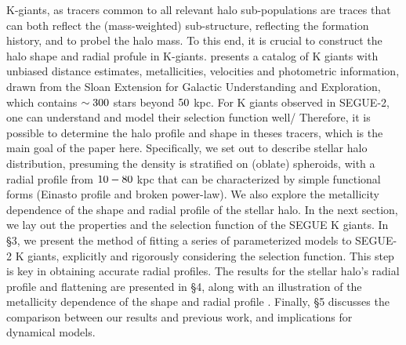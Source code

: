 \documentclass[12pt,preprint]{aastex}
\begin{document}
K-giants, as tracers common to all relevant halo sub-populations are traces that can both reflect the (mass-weighted) sub-structure, reflecting the formation history, and to probel the halo mass. To this end, it is crucial to construct the halo shape and radial profule in K-giants. \citet{Xue2014} presents a catalog of K giants with unbiased distance estimates, metallicities, velocities and photometric information, drawn from the Sloan Extension for Galactic Understanding and Exploration\citep[][SEGUE]{Yanny2009b}, which contains $\rm \sim 300$ stars beyond $\rm 50~$kpc.
For K giants observed in SEGUE-2, one can understand and model their selection function well/ Therefore, it is possible to determine the halo profile and shape in theses tracers, which is the main goal of the paper here.
Specifically, we set out to describe stellar halo distribution, presuming the density is stratified on (oblate) spheroids, with a radial profile from $\rm 10-80~$kpc that can be characterized by simple  functional forms (Einasto profile and broken power-law). We also explore the metallicity dependence of the shape and radial profile of the stellar halo.
In the next section, we lay out the properties and the selection function of the SEGUE K giants. In \S 3, we present the method of fitting a series of parameterized models to SEGUE-2 K giants, explicitly and rigorously considering the selection function. This step is key in obtaining accurate radial profiles. The results for the stellar halo's radial profile and flattening are presented in \S 4, along with an illustration of the metallicity dependence of the shape and radial profile . Finally, \S 5 discusses the comparison between our results and previous work, and implications for dynamical models.
\end{document}
